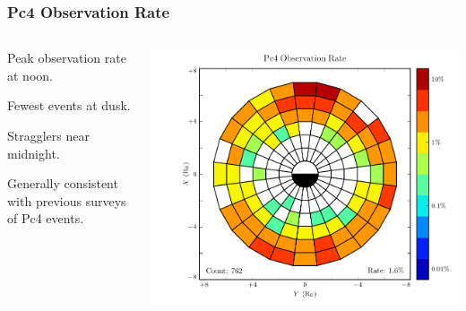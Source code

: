 \documentclass{beamer}
\begin{document}
\begin{frame}
\frametitle{Pc4 Observation Rate}

\begin{columns}
\begin{wideitemize}
\item Peak observation rate at noon.  
\item Fewest events at dusk. 
\item Stragglers near midnight. 
\item Generally consistent with previous surveys of Pc4 events. 
\end{wideitemize}
\includegraphics[width=\textwidth]{figures/rate_all_sharp.pdf}
\end{columns}

\end{frame}

\end{document}
